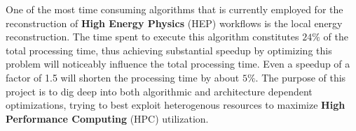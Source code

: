 One of the most time consuming algorithms that is currently employed for the reconstruction of \textbf{High Energy Physics} (HEP) workflows is the local energy reconstruction. The time spent to execute this algorithm constitutes $24\%$ of the total processing time, thus achieving substantial speedup by optimizing this problem will noticeably influence the total processing time. Even a speedup of a factor of 1.5 will shorten the processing time by about $5\%$. The purpose of this project is to dig deep into both algorithmic and architecture dependent optimizations, trying to best exploit heterogenous resources to maximize \textbf{High Performance Computing} (HPC) utilization.